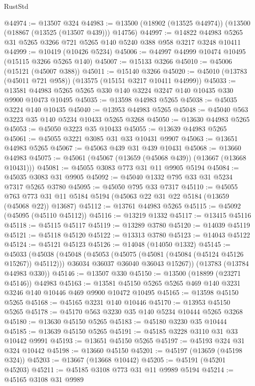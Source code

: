 \begin{lexlean}{RustStd}
\begin{coremodule}
@44974 := @13507 @324
@44983 := @13500 (@18902 (@13525 @44974)) (@13500 (@18867 (@13525 (@13507 @439))) @14756)
@44997 := @14822 @44983 @5265 @31 @5265 @3266 @721 @5265 @140 @5240 @388 @958 @3217 @3248 @10411
@44999 := @10419 (@10426 @5234)
@45006 := @44997 @44999 @10474 @10495 (@15115 @3266 @5265 @140)
@45007 := @15133 @3266
@45010 := @45006 (@15121 (@45007 @388))
@45011 := @15140 @3266
@45020 := @45010 (@13783 (@45011 @721 @958)) (@13575 (@15151 @3217 @10411 @44999))
@45033 := @13581 @44983 @5265 @5265 @330 @140 @3224 @3247 @140 @10435 @330 @9900 @10473 @10495
@45035 := @13598 @44983 @5265
@45038 := @45035 @3224 @140 @10435
@45040 := @13953 @44983 @5265
@45048 := @45040 @563 @3223 @35 @140 @5234 @10433 @5265 @3268
@45050 := @13630 @44983 @5265
@45053 := @45050 @3223 @35 @10433
@45055 := @13639 @44983 @5265
@45061 := @45055 @3221 @3085 @31 @33 @10431 @9907
@45063 := @13651 @44983 @5265
@45067 := @45063 @439 @31 @439 @10431
@45068 := @13660 @44983
@45075 := @45061 (@45067 (@13659 (@45068 @439)) (@13667 (@13668 @10431)))
@45081 := @45055 @3083 @773 @31 @11 @9905 @5194
@45084 := @45035 @3083 @31 @9905
@45092 := @45040 @1332 @795 @33 @31 @5234 @7317 @5265 @3780
@45095 := @45050 @795 @33 @7317
@45110 := @45055
    @763
    @773
    @31
    @11
    @5184
    @5194
    (@45063 @22 @31 @22 @5184 (@13659 (@45068 @22)) @13687)
@45112 := @13761 @44983 @5265
@45115 := @45092 (@45095 (@45110 @45112))
@45116 := @13219 @1332
@45117 := @13415 @45116
@45118 := @45115 @45117
@45119 := @13289 @3780
@45120 := @14039 @45119
@45121 := @45118 @45120
@45122 := @13313 @3780
@45123 := @14043 @45122
@45124 := @45121 @45123
@45126 := @14048 (@14050 @1332)
@45145 := @45033
    (@45038
      (@45048
        (@45053 (@45075 (@45081 (@45084 (@45124 @45126 @15267)) @45112)))
        @36034
        @36037
        @36040
        @36043
        @15267))
    (@13783 (@13784 @44983 @330))
@45146 := @13507 @330
@45150 := @13500 (@18899 (@23271 @45146)) @44983
@45163 := @13581 @45150 @5265 @5265 @469 @140 @3231 @3246 @140 @10446 @469 @9900 @10472 @10495
@45165 := @13598 @45150 @5265
@45168 := @45165 @3231 @140 @10446
@45170 := @13953 @45150 @5265
@45178 := @45170 @563 @3230 @35 @140 @5234 @10444 @5265 @3268
@45180 := @13630 @45150 @5265
@45183 := @45180 @3230 @35 @10444
@45185 := @13639 @45150 @5265
@45191 := @45185 @3228 @3110 @31 @33 @10442 @9991
@45193 := @13651 @45150 @5265
@45197 := @45193 @324 @31 @324 @10442
@45198 := @13660 @45150
@45201 := @45197 (@13659 (@45198 @324))
@45203 := @13667 (@13668 @10442)
@45205 := @45191 (@45201 @45203)
@45211 := @45185 @3108 @773 @31 @11 @9989 @5194
@45214 := @45165 @3108 @31 @9989

\end{coremodule}
\end{lexlean}
